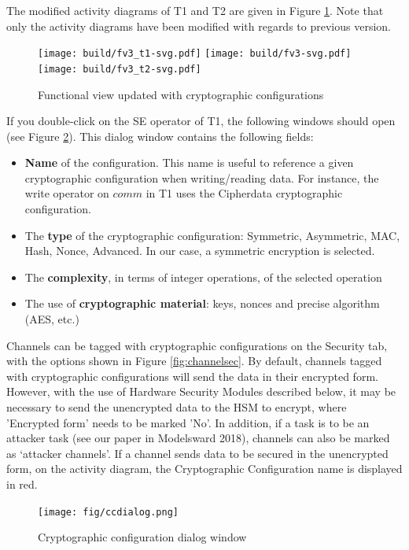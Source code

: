 \documentclass[12pt]{article}
\begin{document}
The modified activity diagrams of T1 and T2 are given in Figure \ref{fig:fv3}. Note that only the activity diagrams have been modified with regards to previous version.

\begin{figure}[htbp]
\centering
\texttt{[image: build/fv3\_t1-svg.pdf]}
\texttt{[image: build/fv3-svg.pdf]}
\texttt{[image: build/fv3\_t2-svg.pdf]}
\caption{Functional view updated with cryptographic configurations} \label{fig:fv3}
\end{figure}

If you double-click on the SE operator of T1, the following windows should open (see Figure \ref{fig:ccdialog}). This dialog window contains the following fields:
\begin{itemize}
\item \textbf{Name} of the configuration. This name is useful to reference a given cryptographic configuration when writing/reading data. For instance, the write operator on $comm$ in T1 uses the Cipherdata cryptographic configuration.
\item The \textbf{type} of the cryptographic configuration: Symmetric, Asymmetric, MAC, Hash, Nonce, Advanced. In our case, a symmetric encryption is selected.
\item The \textbf{complexity}, in terms of integer operations, of the selected operation
\item The use of \textbf{cryptographic material}: keys, nonces and precise algorithm (AES, etc.) 
\end{itemize}

Channels can be tagged with cryptographic configurations on the Security tab, with the options shown in Figure \ref{fig:channelsec}. By default, channels tagged with cryptographic configurations will send the data in their encrypted form. However, with the use of Hardware Security Modules described below, it may be necessary to send the unencrypted data to the HSM to encrypt, where 'Encrypted form' needs to be marked 'No'. In addition, if a task is to be an attacker task (see our paper in Modelsward 2018), channels can also be marked as `attacker channels'. If a channel sends data to be secured in the unencrypted form, on the activity diagram, the Cryptographic Configuration name is displayed in red. 


\begin{figure}[htbp]
\centering
\texttt{[image: fig/ccdialog.png]}
\caption{Cryptographic configuration dialog window} \label{fig:ccdialog}
\end{figure}
\end{document}
